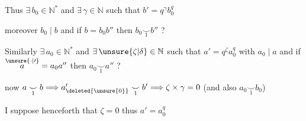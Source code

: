 Thus $\exists\,b_0\in\mathbb N^*$ and $\exists\,\gamma\in\mathbb N$ such that $b'=q^\gamma b_0^q$ 

moreover $b_0\mid b$ and if $b=b_0 b''$ then $b_0\mathrel{\underset{1}{\smile}}b''$ ?

Similarly $\exists\,a_0\in\mathbb N^*$ and $\exists\,\unsure{\zeta|\delta}\in\mathbb N$ such that $a'=q^\zeta a_0^q$ with $a_0\mid a$ and if $\overset{\unsure{\cdot|\prime}}{a}=a_0a''$ then $a_0\mathrel{\underset{1}{\smile}}a''$ ?

now $a\mathrel{\underset{1}{\smile}}b\Longrightarrow a_{\deleted{\unsure{0}}}'\mathrel{\underset{1}{\smile}}b'\Longrightarrow\zeta\times\gamma=0$ (and also $a_0\mathrel{\underset{1}{\smile}}b_0$)

I suppose henceforth that $\zeta=0$ thus $a'=a_0^q$

